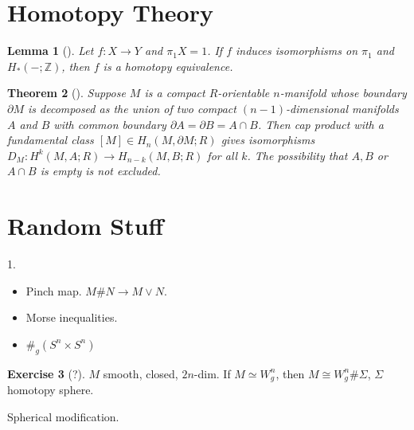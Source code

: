 \documentclass[reqno]{amsart}
\newtheorem{theorem}{Theorem}[section]
\newtheorem{lemma}[theorem]{Lemma}
\theoremstyle{definition}
\newtheorem{exercise}[theorem]{Exercise}
\theoremstyle{remark}
\begin{document}
   \section{Homotopy Theory}

   \begin{lemma}[]\label{Lemma:994821}
       Let $f \colon X \to Y$ and
       $\pi_1 X = 1$. If
       $f$ induces isomorphisms on
       $\pi_1$ and $H_{*}(-; \mathbb{Z})$, then
       $f$ is a homotopy equivalence.
   \end{lemma}

   \begin{theorem}[]\label{Thm:293009}
       Suppose $M$ is a compact $R$-orientable $n$-manifold
       whose boundary $\partial M$ is decomposed as the
       union of two compact $\left( n-1 \right) $-dimensional
       manifolds $A$ and $B$ with common boundary
       $\partial A = \partial B = A \cap B$. Then
       cap product with a fundamental class
       $\left[ M \right] \in 
       H_n \left( M, \partial M ; R \right) $ gives isomorphisms
       $D_M \colon H^{k}\left( M,A;R \right) 
       \to H_{n-k}\left( M,B;R \right) $ for all
       $k$. The possibility that $A,B$ or $A \cap B$ is
       empty is not excluded.
   \end{theorem}

   \section{Random Stuff}

   1.

   \begin{itemize}
       \item Pinch map. $M \# N \to M \vee N$.
       \item Morse inequalities.
       \item $\#_g \left( S^{n}\times S^{n} \right) $
   \end{itemize}


   \begin{exercise}[?]
       $M$ smooth, closed, $2n$-dim. If
           $M \simeq W_g^{n}$, then
           $M \cong W_g^{n} \# \Sigma$,
           $\Sigma$ homotopy sphere.
   \end{exercise}



   Spherical modification.





\printbibliography
\end{document}

